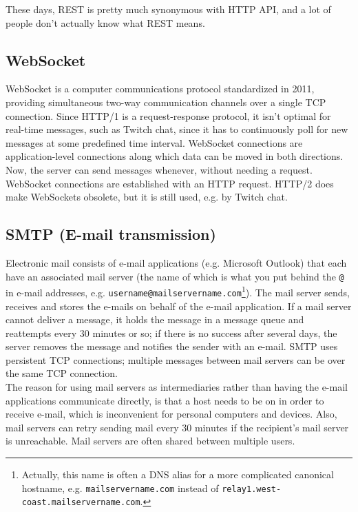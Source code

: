\documentclass[table, xcdraw]{article}%
\begin{document}
These days, REST is pretty much synonymous with HTTP API, and a lot of people don't actually know what REST means.

\subsection{WebSocket}

WebSocket is a computer communications protocol standardized in 2011, providing simultaneous two-way communication channels over a single TCP connection. Since HTTP/1 is a request-response protocol, it isn't optimal for real-time messages, such as Twitch chat, since it has to continuously poll for new messages at some predefined time interval. WebSocket connections are application-level connections along which data can be moved in both directions. Now, the server can send messages whenever, without needing a request. WebSocket connections are established with an HTTP request. HTTP/2 does make WebSockets obsolete, but it is still used, e.g. by Twitch chat.

\subsection{SMTP (E-mail transmission)}

Electronic mail consists of e-mail applications (e.g. Microsoft Outlook) that each have an associated mail server (the name of which is what you put behind the \texttt{@} in e-mail addresses, e.g. \texttt{username@mailservername.com}\footnote{Actually, this name is often a DNS alias for a more complicated canonical hostname, e.g. \texttt{mailservername.com} instead of \texttt{relay1.west-coast.mailservername.com}.}). The mail server sends, receives and stores the e-mails on behalf of the e-mail application. If a mail server cannot deliver a message, it holds the message in a message queue and reattempts every 30 minutes or so; if there is no success after several days, the server removes the message and notifies the sender with an e-mail. SMTP uses persistent TCP connections; multiple messages between mail servers can be over the same TCP connection.\\
The reason for using mail servers as intermediaries rather than having the e-mail applications communicate directly, is that a host needs to be on in order to receive e-mail, which is inconvenient for personal computers and devices. Also, mail servers can retry sending mail every 30 minutes if the recipient's mail server is unreachable. Mail servers are often shared between multiple users.
\end{document}
